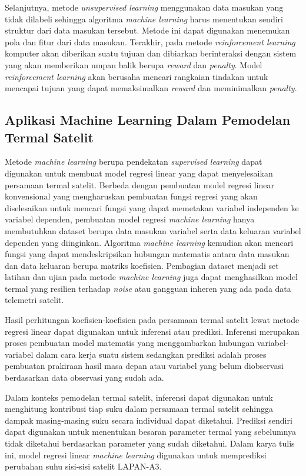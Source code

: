 Selanjutnya, metode \textit{unsupervised learning} menggunakan data masukan
yang tidak dilabeli sehingga algoritma \textit{machine learning} harus
menentukan sendiri struktur dari data masukan tersebut. Metode ini dapat
digunakan menemukan pola dan fitur dari data masukan. Terakhir, pada metode
\textit{reinforcement learning} komputer akan diberikan suatu tujuan dan
dibiarkan berinteraksi dengan sistem yang akan memberikan umpan balik berupa
\textit{reward} dan \textit{penalty}. Model \textit{reinforcement learning}
akan berusaha mencari rangkaian tindakan untuk mencapai tujuan yang dapat
memaksimalkan \textit{reward} dan meminimalkan \textit{penalty}.

\subsection{Aplikasi Machine Learning Dalam Pemodelan Termal Satelit}

Metode \textit{machine learning} berupa pendekatan \textit{supervised learning}
dapat digunakan untuk membuat model regresi linear yang dapat menyelesaikan
persamaan termal satelit. Berbeda dengan pembuatan model regresi linear
konvensional yang mengharuskan pembuatan fungsi regresi yang akan diselesaikan
untuk mencari fungsi yang dapat memetakan variabel independen ke variabel
dependen, pembuatan model regresi \textit{machine learning} hanya membutuhkan
dataset berupa data masukan variabel serta data keluaran variabel dependen yang
diinginkan. Algoritma \textit{machine learning} kemudian akan mencari fungsi
yang dapat mendeskripsikan hubungan matematis antara data masukan dan data
keluaran berupa matriks koefisien. Pembagian dataset menjadi set latihan dan ujian pada metode \textit{machine learning} juga dapat menghasilkan model termal yang resilien terhadap \textit{noise} atau gangguan inheren yang ada pada data telemetri satelit.

Hasil perhitungan koefisien-koefisien pada persamaan termal satelit lewat
metode regresi linear dapat digunakan untuk inferensi atau prediksi. Inferensi
merupakan proses pembuatan model matematis yang menggambarkan hubungan
variabel-variabel dalam cara kerja suatu sistem sedangkan prediksi adalah
proses pembuatan prakiraan hasil masa depan atau variabel yang belum
diobservasi berdasarkan data observasi yang sudah ada. 

Dalam konteks pemodelan termal satelit, inferensi dapat digunakan untuk
menghitung kontribusi tiap suku dalam persamaan termal satelit sehingga dampak
masing-masing suku secara individual dapat diketahui. Prediksi sendiri dapat
digunakan untuk menentukan besaran parameter termal yang sebelumnya tidak
diketahui berdasarkan parameter yang sudah diketahui. Dalam karya tulis ini, model regresi linear \textit{machine learning} digunakan untuk memprediksi perubahan suhu sisi-sisi satelit LAPAN-A3.

